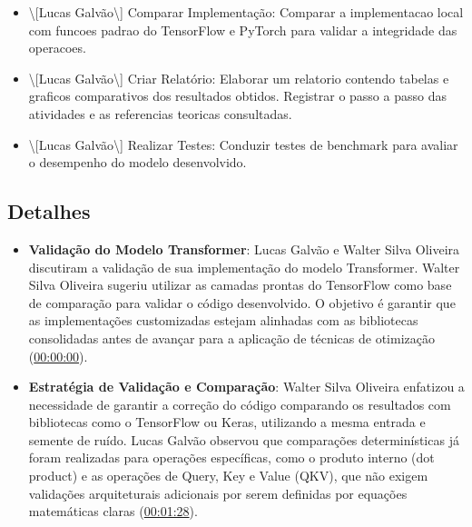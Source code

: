 \begin{itemize}
\item \textbackslash{}[Lucas Galvão\textbackslash{}] Comparar Implementação: Comparar a implementacao local com funcoes padrao do TensorFlow e PyTorch para validar a integridade das operacoes.
\end{itemize}

\begin{itemize}
\item \textbackslash{}[Lucas Galvão\textbackslash{}] Criar Relatório: Elaborar um relatorio contendo tabelas e graficos comparativos dos resultados obtidos. Registrar o passo a passo das atividades e as referencias teoricas consultadas.
\end{itemize}

\begin{itemize}
\item \textbackslash{}[Lucas Galvão\textbackslash{}] Realizar Testes: Conduzir testes de benchmark para avaliar o desempenho do modelo desenvolvido.
\end{itemize}


\subsection{\textbf{Detalhes}}


\begin{itemize}
\item \textbf{Validação do Modelo Transformer}: Lucas Galvão e Walter Silva Oliveira discutiram a validação de sua implementação do modelo Transformer. Walter Silva Oliveira sugeriu utilizar as camadas prontas do TensorFlow como base de comparação para validar o código desenvolvido. O objetivo é garantir que as implementações customizadas estejam alinhadas com as bibliotecas consolidadas antes de avançar para a aplicação de técnicas de otimização (\href{\#00:00:00}{00:00:00}).
\end{itemize}

\begin{itemize}
\item \textbf{Estratégia de Validação e Comparação}: Walter Silva Oliveira enfatizou a necessidade de garantir a correção do código comparando os resultados com bibliotecas como o TensorFlow ou Keras, utilizando a mesma entrada e semente de ruído. Lucas Galvão observou que comparações determinísticas já foram realizadas para operações específicas, como o produto interno (dot product) e as operações de Query, Key e Value (QKV), que não exigem validações arquiteturais adicionais por serem definidas por equações matemáticas claras (\href{\#00:01:28}{00:01:28}).
\end{itemize}

